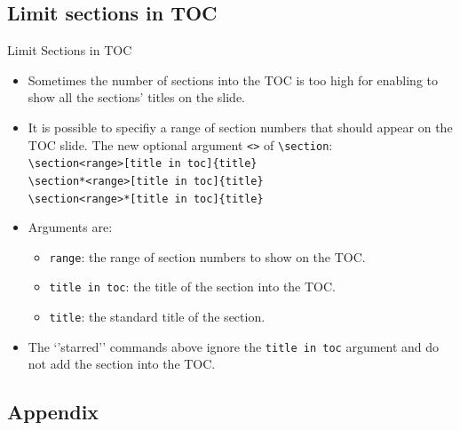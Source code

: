 \documentclass[english,sectioncirclenumberstyle]{ciadbeamer}
\begin{document}
\subsection{Limit sections in TOC}

\begin{frame}{{Limit Sections} in TOC}
	\begin{itemize}
	\item Sometimes the number of sections into the TOC is too high for enabling to show all the sections' titles on the slide.
	\item It is possible to specifiy a range of section numbers that should appear on the TOC slide. The new optional argument \texttt{<>} of \texttt{{\textbackslash}section}: \\
		\texttt{{\textbackslash}section<range>[title in toc]\{title\}} \\
		\texttt{{\textbackslash}section*<range>[title in toc]\{title\}} \\
		\texttt{{\textbackslash}section<range>*[title in toc]\{title\}}
	\vfill
	\item Arguments are: \begin{itemize}
		\item \texttt{range}: the range of section numbers to show on the TOC.
		\item \texttt{title in toc}: the title of the section into the TOC.
		\item \texttt{title}: the standard title of the section.
		\end{itemize}
	\item The `'starred'' commands above ignore the \texttt{title in toc} argument and do not add the section into the TOC.
	\end{itemize}
\end{frame}

\subsection{Appendix}
\end{document}
